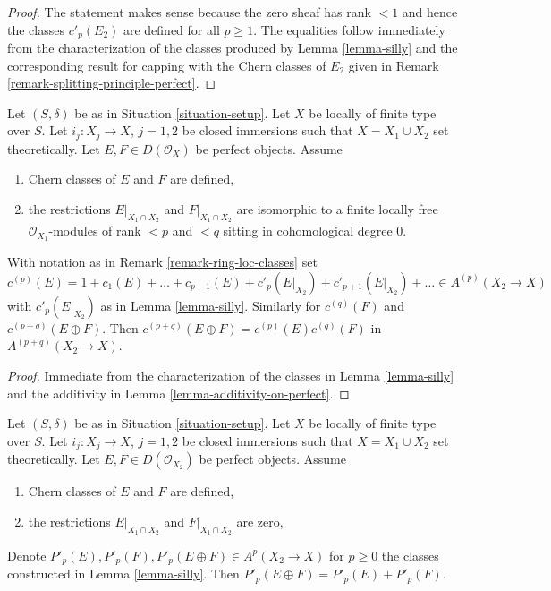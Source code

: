 \begin{proof}
The statement makes sense because the zero sheaf has rank $< 1$ and
hence the classes $c'_p(E_2)$ are defined for all $p \geq 1$. The equalities
follow immediately from the characterization of the classes produced
by Lemma \ref{lemma-silly} and the corresponding result for
capping with the Chern classes of $E_2$ given in
Remark \ref{remark-splitting-principle-perfect}.
\end{proof}

\begin{lemma}
\label{lemma-silly-sum-c}
Let $(S, \delta)$ be as in Situation \ref{situation-setup}. Let $X$ be
locally of finite type over $S$. Let $i_j : X_j \to X$, $j = 1, 2$
be closed immersions such that $X = X_1 \cup X_2$ set theoretically. Let
$E, F \in D(\mathcal{O}_X)$ be perfect objects. Assume
\begin{enumerate}
\item Chern classes of $E$ and $F$ are defined,
\item the restrictions $E|_{X_1 \cap X_2}$ and $F|_{X_1 \cap X_2}$
are isomorphic to a finite locally free $\mathcal{O}_{X_1}$-modules
of rank $< p$ and $< q$ sitting in cohomological degree $0$.
\end{enumerate}
With notation as in Remark \ref{remark-ring-loc-classes} set
$$
c^{(p)}(E) = 1 + c_1(E) + \ldots + c_{p - 1}(E) +
c'_p(E|_{X_2}) + c'_{p + 1}(E|_{X_2}) + \ldots \in A^{(p)}(X_2 \to X)
$$
with $c'_p(E|_{X_2})$ as in Lemma \ref{lemma-silly}. Similarly
for $c^{(q)}(F)$ and $c^{(p + q)}(E \oplus F)$.
Then $c^{(p + q)}(E \oplus F) = c^{(p)}(E)c^{(q)}(F)$
in $A^{(p + q)}(X_2 \to X)$.
\end{lemma}

\begin{proof}
Immediate from the characterization of the classes in
Lemma \ref{lemma-silly} and the additivity in
Lemma \ref{lemma-additivity-on-perfect}.
\end{proof}

\begin{lemma}
\label{lemma-silly-sum-P}
Let $(S, \delta)$ be as in Situation \ref{situation-setup}. Let $X$ be
locally of finite type over $S$. Let $i_j : X_j \to X$, $j = 1, 2$
be closed immersions such that $X = X_1 \cup X_2$ set theoretically. Let
$E, F \in D(\mathcal{O}_{X_2})$ be perfect objects. Assume
\begin{enumerate}
\item Chern classes of $E$ and $F$ are defined,
\item the restrictions $E|_{X_1 \cap X_2}$ and $F|_{X_1 \cap X_2}$ are zero,
\end{enumerate}
Denote $P'_p(E), P'_p(F), P'_p(E \oplus F) \in A^p(X_2 \to X)$ for $p \geq 0$
the classes constructed in Lemma \ref{lemma-silly}. Then
$P'_p(E \oplus F) = P'_p(E) + P'_p(F)$.
\end{lemma}

